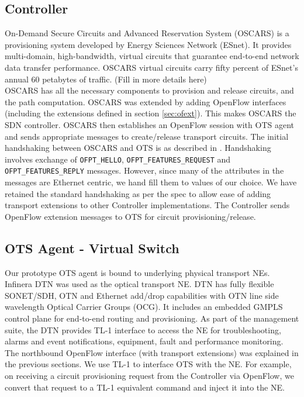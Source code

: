 \documentclass{sig-alternate-10pt}
\begin{document}
	\subsection{Controller}
	\label{sec:oscars}
	On-Demand Secure Circuits and Advanced Reservation System (OSCARS) \cite{oscars} is a provisioning system
	developed by Energy Sciences Network (ESnet). It provides multi-domain, high-bandwidth, virtual circuits
	that guarantee end-to-end network data transfer performance. OSCARS virtual circuits carry fifty percent
	of ESnet's annual 60 petabytes of traffic. (Fill in more details here) \\
	
	OSCARS has all the necessary components to provision and release circuits, and the path computation.
	OSCARS was extended by adding OpenFlow interfaces (including the extensions defined in section
	\ref{sec:ofext}). This makes OSCARS the SDN controller. OSCARS then establishes an OpenFlow session with
	OTS agent and sends appropriate messages to create/release transport circuits. The initial handshaking
	between OSCARS and OTS is as described in \cite{OF1.0}. Handshaking involves exchange of
	\texttt{OFPT\_HELLO}, \texttt{OFPT\_FEATURES\_REQUEST} and \texttt{OFPT\_FEATURES\_REPLY} messages.
	However, since many of the attributes in the messages are Ethernet centric, we hand fill them to values
	of our choice. We have retained the standard handshaking as per the spec to allow ease of adding
	transport extensions to other Controller implementations. The Controller sends OpenFlow extension
	messages to OTS for circuit provisioning/release.
	
	\subsection{OTS Agent - Virtual Switch}
	\label{sec:otvs}
	Our prototype OTS agent is bound to underlying physical transport NEs. Infinera DTN \cite{dtn} was used
	as the optical transport NE. DTN has fully flexible SONET/SDH, OTN and Ethernet add/drop
	capabilities with OTN \cite{otn} line side wavelength Optical Carrier Groups (OCG). It includes an
	embedded GMPLS control plane for end-to-end routing and provisioning. As part of the management suite,
	the DTN provides TL-1 interface to access the NE for troubleshooting, alarms and event
	notifications, equipment, fault and performance monitoring. The northbound OpenFlow interface (with
	transport extensions) was explained in the previous sections. We use TL-1 to interface OTS with the NE.
	For example, on receiving a circuit provisioning request from the Controller via OpenFlow, we convert
	that request to a TL-1 equivalent command and inject it into the NE. \\
\end{document}
